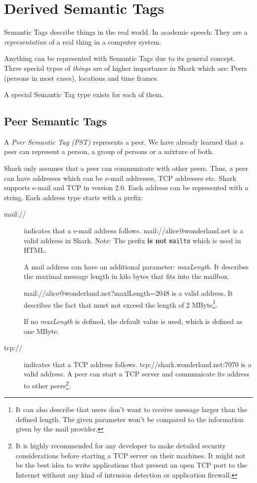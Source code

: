 \chapter{Derived Semantic Tags}
Semantic Tags describe things in the real world. In academic speech: They are a {\it representation} of a real thing in a computer system.

Anything can be represented with Semantic Tags due to its general concept. Three special types of {\it things} are of higher importance in Shark which are: Peers (persons in most cases), locations and time frames.

A special Semantic Tag type exists for each of them.

\section{Peer Semantic Tags}
A {\it Peer Semantic Tag (PST)} represents a peer. We have already learned that a peer can represent a person, a group of persons or a mixture of both.

Shark only assumes that a peer can communicate with other peers. Thus, a peer can have addresses which can be e-mail addresses, TCP addresses etc. Shark supports e-mail and TCP in version 2.0. Each address can be represented with a string. Each address type starts with a prefix:

\begin{description}
    \item[mail://] indicates that a e-mail address follows. mail://alice@wonderland.net is a valid address in Shark. Note: The prefix {\bf is not} {\tt mailto} which is used in HTML.

A mail address can have an additional parameter: {\it maxLength}. It describes the maximal message length in kilo bytes that fits into the mailbox.

mail://alice@wonderland.net?maxlLength=2048 is a valid address. It describes the fact that must not exceed the length of 2 MByte\footnote{It can also describe that users don't want to receive message larger than the defined length. The given parameter won't be compared to the information given by the mail provider.}.

If no {\it maxLength} is defined, the default value is used, which is defined as one MByte.

    \item[tcp://] indicates that a TCP address follows.
tcp://shark.wonderland.net:7070 is a valid address. A peer can start a TCP server and communicate its address to other peers\footnote{It is highly recommended for any developer to make detailed security considerations before starting a TCP server on their machines. It might not be the best idea to write applications that present an open TCP port to the Internet without any kind of intrusion detection or application firewall.}.

\end{description}

